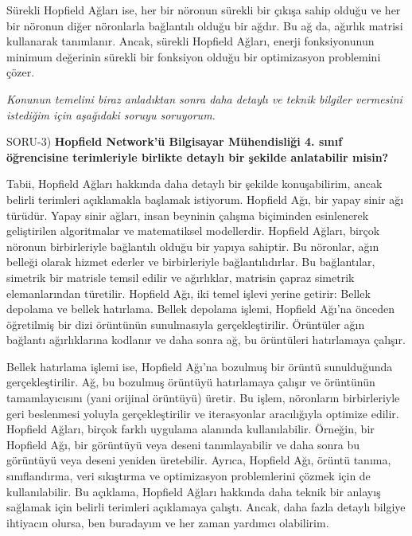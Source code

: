 \documentclass[11pt]{article}
\begin{document}
Sürekli Hopfield Ağları ise, her bir nöronun sürekli bir çıkışa sahip olduğu ve her bir nöronun diğer nöronlarla bağlantılı olduğu bir ağdır. Bu ağ da, ağırlık matrisi kullanarak tanımlanır. Ancak, sürekli Hopfield Ağları, enerji fonksiyonunun minimum değerinin sürekli bir fonksiyon olduğu bir optimizasyon problemini çözer.


\textit{Konunun temelini biraz anladıktan sonra daha detaylı ve teknik bilgiler vermesini istediğim için aşağıdaki soruyu soruyorum.}

SORU-3)
\textbf{Hopfield Network'ü Bilgisayar Mühendisliği 4. sınıf öğrencisine terimleriyle birlikte detaylı bir şekilde anlatabilir misin?}

Tabii, Hopfield Ağları hakkında daha detaylı bir şekilde konuşabilirim, ancak belirli terimleri açıklamakla başlamak istiyorum. Hopfield Ağı, bir yapay sinir ağı türüdür. Yapay sinir ağları, insan beyninin çalışma biçiminden esinlenerek geliştirilen algoritmalar ve matematiksel modellerdir.
Hopfield Ağları, birçok nöronun birbirleriyle bağlantılı olduğu bir yapıya sahiptir. Bu nöronlar, ağın belleği olarak hizmet ederler ve birbirleriyle bağlantılıdırlar. Bu bağlantılar, simetrik bir matrisle temsil edilir ve ağırlıklar, matrisin çapraz simetrik elemanlarından türetilir.
Hopfield Ağı, iki temel işlevi yerine getirir: Bellek depolama ve bellek hatırlama. Bellek depolama işlemi, Hopfield Ağı'na önceden öğretilmiş bir dizi örüntünün sunulmasıyla gerçekleştirilir. Örüntüler ağın bağlantı ağırlıklarına kodlanır ve daha sonra ağ, bu örüntüleri hatırlamaya çalışır.

Bellek hatırlama işlemi ise, Hopfield Ağı'na bozulmuş bir örüntü sunulduğunda gerçekleştirilir. Ağ, bu bozulmuş örüntüyü hatırlamaya çalışır ve örüntünün tamamlayıcısını (yani orijinal örüntüyü) üretir. Bu işlem, nöronların birbirleriyle geri beslenmesi yoluyla gerçekleştirilir ve iterasyonlar aracılığıyla optimize edilir.
Hopfield Ağları, birçok farklı uygulama alanında kullanılabilir. Örneğin, bir Hopfield Ağı, bir görüntüyü veya deseni tanımlayabilir ve daha sonra bu görüntüyü veya deseni yeniden üretebilir. Ayrıca, Hopfield Ağı, örüntü tanıma, sınıflandırma, veri sıkıştırma ve optimizasyon problemlerini çözmek için de kullanılabilir.
Bu açıklama, Hopfield Ağları hakkında daha teknik bir anlayış sağlamak için belirli terimleri açıklamaya çalıştı. Ancak, daha fazla detaylı bilgiye ihtiyacın olursa, ben buradayım ve her zaman yardımcı olabilirim.
\end{document}

